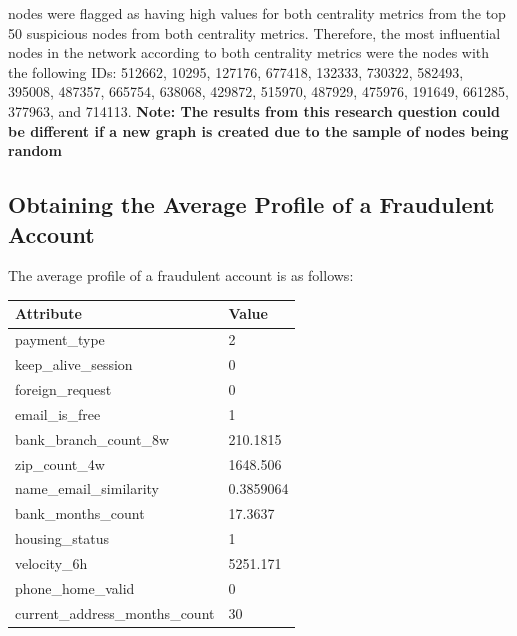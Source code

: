 \documentclass{styles/svproc}
\begin{document}

\smallskip
{} nodes were flagged as having high values for both centrality metrics from the top 50 suspicious nodes from both centrality metrics. Therefore, the most influential nodes in the network according to both centrality metrics were the nodes with the following IDs: 512662, 10295, 127176, 677418, 132333, 730322, 582493, 395008, 487357, 665754, 638068, 429872, 515970, 487929, 475976, 191649, 661285, 377963, and 714113. \textbf{Note: The results from this research question could be different if a new graph is created due to the sample of nodes being random}

\subsection{Obtaining the Average Profile of a Fraudulent Account}
\normalfont
The average profile of a fraudulent account is as follows:

\begin{tabular}{ | m{7cm} | m{3cm}|} 
  \hline
  \textbf{Attribute} & \textbf{Value} \\ 
  \hline
  payment\_type & 2 \\ 
  \hline
  keep\_alive\_session & 0 \\ 
  \hline
  foreign\_request & 0 \\
  \hline
  email\_is\_free & 1 \\
  \hline
  bank\_branch\_count\_8w & 210.1815 \\
  \hline
  zip\_count\_4w & 1648.506 \\
  \hline
  name\_email\_similarity & 0.3859064 \\
  \hline
  bank\_months\_count & 17.3637 \\
  \hline
  housing\_status & 1 \\
  \hline
  velocity\_6h & 5251.171 \\
  \hline
  phone\_home\_valid & 0 \\
  \hline
  current\_address\_months\_count & 30 \\
  \hline
\end{tabular}

\end{document}
